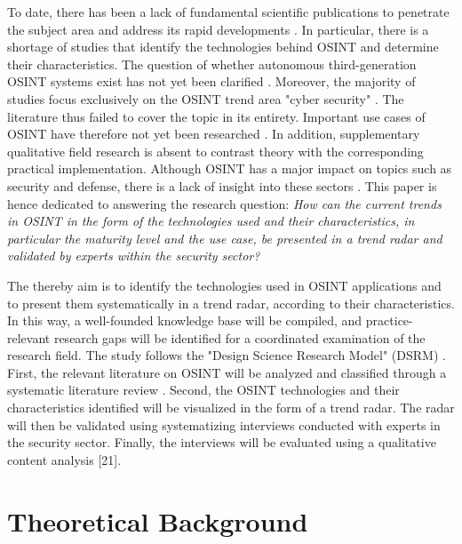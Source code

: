 \documentclass[10pt]{article}
\begin{document}
To date, there has been a lack of fundamental scientific publications to penetrate
the subject area \cite{HerreraCubides.2020} and address its rapid
developments \cite{Ghioni.2023, Williams.2018}. In particular, there is a shortage of
studies that identify the technologies behind OSINT and determine their characteristics.
The question of whether autonomous third-generation OSINT systems \cite{PastorGalindo.2019, PastorGalindo.2020} exist
has not yet been clarified \cite{Ghioni.2023, PastorGalindo.2020,Yogish.2021}.
Moreover, the majority of studies focus exclusively on the OSINT trend area "cyber
security" \cite{Hwang.2022, PastorGalindo.2019, Yogish.2021}. The literature thus failed to
cover the topic in its entirety. Important use cases of OSINT have
therefore not yet been researched \cite{AlKilani.2021, Dokman.2020, Ghioni.2023}.
In addition, supplementary qualitative field research is absent to contrast theory with
the corresponding practical implementation. Although OSINT has a major impact on topics
such as security and defense, there is a lack of insight into these sectors \cite{HerreraCubides.2020, PastorGalindo.2019}.
This paper is hence dedicated to answering the research question:
\textit{How can the current trends in OSINT in the form of the technologies used and their
    characteristics, in particular the maturity level and the use case, be presented in a
    trend radar and validated by experts within the security sector?}

The thereby aim is to identify the technologies used in OSINT applications and to present
them systematically in a trend radar, according to their characteristics. In this way, a well-founded knowledge base will
be compiled, and practice-relevant research gaps will be identified for a coordinated examination
of the research field. The study follows the "Design Science Research Model" (DSRM)
\cite{Peffers.2007}.  First, the relevant literature on OSINT will be analyzed and classified
through a systematic literature review \cite{Webster.2002}. Second, the OSINT technologies and
their characteristics identified will be visualized in the form of a trend radar. The radar
will then be validated using systematizing interviews \cite{Bogner.2014} conducted with
experts in the security sector. Finally, the interviews will be evaluated using a
qualitative content analysis [21].

\section{Theoretical Background}
\end{document}
